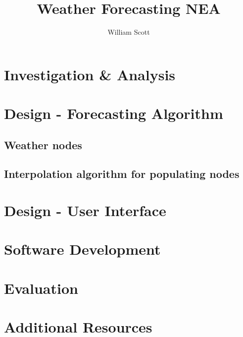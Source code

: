 \documentclass{article}
\title{Weather Forecasting NEA}
\author{William Scott}
\date{}
\begin{document}
\maketitle
\tableofcontents

\section{Investigation \& Analysis}
\section{Design - Forecasting Algorithm}
\subsection*{Weather nodes}
\subsection*{Interpolation algorithm for populating nodes}
\section{Design - User Interface}
\section{Software Development}
\section{Evaluation}
\section{Additional Resources}
\end{document}
